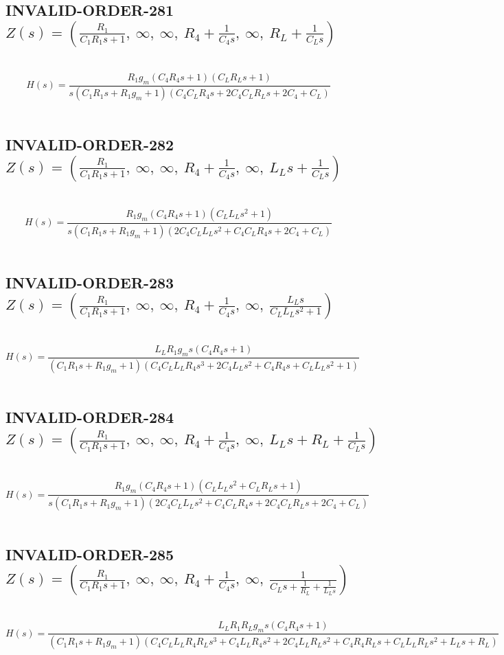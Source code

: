 \documentclass{article}
\begin{document}
\subsection{INVALID-ORDER-281 $Z(s) = \left( \frac{R_{1}}{C_{1} R_{1} s + 1}, \  \infty, \  \infty, \  R_{4} + \frac{1}{C_{4} s}, \  \infty, \  R_{L} + \frac{1}{C_{L} s}\right)$ } \ 
\textbf{\[H(s) = \frac{R_{1} g_{m} \left(C_{4} R_{4} s + 1\right) \left(C_{L} R_{L} s + 1\right)}{s \left(C_{1} R_{1} s + R_{1} g_{m} + 1\right) \left(C_{4} C_{L} R_{4} s + 2 C_{4} C_{L} R_{L} s + 2 C_{4} + C_{L}\right)}\] } \ 
\subsection{INVALID-ORDER-282 $Z(s) = \left( \frac{R_{1}}{C_{1} R_{1} s + 1}, \  \infty, \  \infty, \  R_{4} + \frac{1}{C_{4} s}, \  \infty, \  L_{L} s + \frac{1}{C_{L} s}\right)$ } \ 
\textbf{\[H(s) = \frac{R_{1} g_{m} \left(C_{4} R_{4} s + 1\right) \left(C_{L} L_{L} s^{2} + 1\right)}{s \left(C_{1} R_{1} s + R_{1} g_{m} + 1\right) \left(2 C_{4} C_{L} L_{L} s^{2} + C_{4} C_{L} R_{4} s + 2 C_{4} + C_{L}\right)}\] } \ 
\subsection{INVALID-ORDER-283 $Z(s) = \left( \frac{R_{1}}{C_{1} R_{1} s + 1}, \  \infty, \  \infty, \  R_{4} + \frac{1}{C_{4} s}, \  \infty, \  \frac{L_{L} s}{C_{L} L_{L} s^{2} + 1}\right)$ } \ 
\textbf{\[H(s) = \frac{L_{L} R_{1} g_{m} s \left(C_{4} R_{4} s + 1\right)}{\left(C_{1} R_{1} s + R_{1} g_{m} + 1\right) \left(C_{4} C_{L} L_{L} R_{4} s^{3} + 2 C_{4} L_{L} s^{2} + C_{4} R_{4} s + C_{L} L_{L} s^{2} + 1\right)}\] } \ 
\subsection{INVALID-ORDER-284 $Z(s) = \left( \frac{R_{1}}{C_{1} R_{1} s + 1}, \  \infty, \  \infty, \  R_{4} + \frac{1}{C_{4} s}, \  \infty, \  L_{L} s + R_{L} + \frac{1}{C_{L} s}\right)$ } \ 
\textbf{\[H(s) = \frac{R_{1} g_{m} \left(C_{4} R_{4} s + 1\right) \left(C_{L} L_{L} s^{2} + C_{L} R_{L} s + 1\right)}{s \left(C_{1} R_{1} s + R_{1} g_{m} + 1\right) \left(2 C_{4} C_{L} L_{L} s^{2} + C_{4} C_{L} R_{4} s + 2 C_{4} C_{L} R_{L} s + 2 C_{4} + C_{L}\right)}\] } \ 
\subsection{INVALID-ORDER-285 $Z(s) = \left( \frac{R_{1}}{C_{1} R_{1} s + 1}, \  \infty, \  \infty, \  R_{4} + \frac{1}{C_{4} s}, \  \infty, \  \frac{1}{C_{L} s + \frac{1}{R_{L}} + \frac{1}{L_{L} s}}\right)$ } \ 
\textbf{\[H(s) = \frac{L_{L} R_{1} R_{L} g_{m} s \left(C_{4} R_{4} s + 1\right)}{\left(C_{1} R_{1} s + R_{1} g_{m} + 1\right) \left(C_{4} C_{L} L_{L} R_{4} R_{L} s^{3} + C_{4} L_{L} R_{4} s^{2} + 2 C_{4} L_{L} R_{L} s^{2} + C_{4} R_{4} R_{L} s + C_{L} L_{L} R_{L} s^{2} + L_{L} s + R_{L}\right)}\] } \ 
\end{document}
